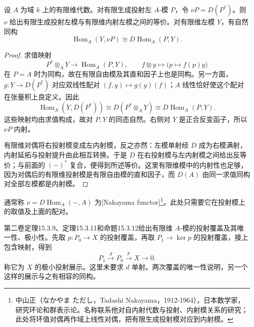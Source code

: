 \begin{lemma}\label{b5:lem:ar-nakayama-pairing}
	设 \(A\) 为域 \(k\) 上的有限维代数。对有限生成投射左 \(A\)-模 \(P\)，令 \(\nu P=D(P^*)\)。则 \(\nu\) 给出有限生成投射左模与有限维内射左模之间的等价。对有限维左模 \(Y\)，有自然同构
	\begin{equation}\label{b5:eq:ar-nakayama-pairing}
		\operatorname{Hom}_A(Y,\nu P)
		\cong D\operatorname{Hom}_A(P,Y).
	\end{equation}
\end{lemma}
\begin{proof}
	求值映射
	\[
		P^*\otimes_A Y\longrightarrow\operatorname{Hom}_A(P,Y),
		\qquad f\otimes y\longmapsto\bigl(p\mapsto f(p)y\bigr)
	\]
	在 \(P=A\) 时为同构，故在有限自由模及其直和因子上也是同构。另一方面，\(g:Y\to D(P^*)\) 对应双线性配对 \((f,y)\mapsto g(y)(f)\)；\(A\) 线性恰好使这个配对在张量积上良定义。因此
	\[
		\operatorname{Hom}_A(Y,D(P^*))
		\cong D(P^*\otimes_A Y)
		\cong D\operatorname{Hom}_A(P,Y).
	\]
	这些映射均由求值构成，故对 \(P,Y\) 的同态自然。右侧对 \(Y\) 是正合反变函子，所以 \(\nu P\) 内射。

	有限维对偶将右投射模变成左内射模，反之亦然：左模单射经 \(D\) 成为右模满射，内射延拓与投射提升由此相互转换。于是 \(D\) 在右投射模与左内射模之间给出反等价；与前面的 \((-)^*\) 复合，便得到所述等价。这里有限维模中的内射性也足够，因为对偶后的有限维投射模是有限自由模的直和因子，而 \(D(A)\) 由同一求值同构对全部左模都是内射模。
\end{proof}
通常称 \(\nu=D\operatorname{Hom}_A(-,A)\) 为[Nakayama functor]\footnote{中山正（なかやま ただし，Tadashi Nakayama，1912-1964），日本数学家，研究环论和群表示论。名称联系他对自内射代数与投射、内射模关系的研究；此处将环值对偶再作域上线性对偶，把有限生成投射模对应到内射模。}。此处只需要它在投射模上的取值及上面的配对。

\ProseParagraphBreak
第二卷定理15.3.9、定理15.3.11和命题15.3.12给出有限维 \(A\)-模的投射覆盖及其唯一性、极小性。先取 \(p:P_0\to X\) 的投射覆盖，再取 \(P_1\to\ker p\) 的投射覆盖，接上包含映射，得到
\begin{equation}\label{b5:eq:ar-minimal-presentation}
	P_1\xrightarrow{d}P_0\xrightarrow{p}X\longrightarrow0.
\end{equation}
称它为 \(X\) 的极小投射展示。这里未要求 \(d\) 单射。两次覆盖的唯一性说明，另一个这样的展示与之有相容的同构。

